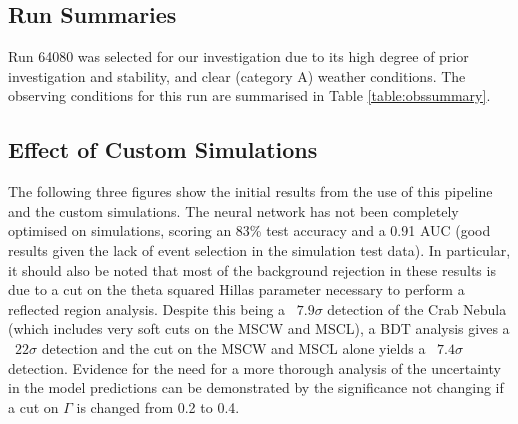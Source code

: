 \subsection{Run Summaries}
Run 64080 was selected for our investigation due to its high degree of prior investigation and stability, and clear (category A) weather conditions. The observing conditions for this run are summarised in Table \ref{table:obssummary}.
\begin{table}[h]
    \centering
    \caption{Observing summary for run 64080}
    \label{table:obssummary}
\end{table}

\subsection{Effect of Custom Simulations}
The following three figures show the initial results from the use of this pipeline and the custom simulations. The neural network has not been completely optimised on simulations, scoring an 83\% test accuracy and a 0.91 AUC (good results given the lack of event selection in the simulation test data). In particular, it should also be noted that most of the background rejection in these results is due to a cut on the theta squared Hillas parameter necessary to perform a reflected region analysis. Despite this being a ~$7.9\sigma$ detection of the Crab Nebula (which includes very soft cuts on the MSCW and MSCL), a BDT analysis gives a ~$22\sigma$ detection and the cut on the MSCW and MSCL alone yields a ~$7.4\sigma$ detection. Evidence for the need for a more thorough analysis of the  uncertainty in the model predictions can be demonstrated by the significance not changing if a cut on $\Gamma$ is changed from 0.2 to 0.4.



